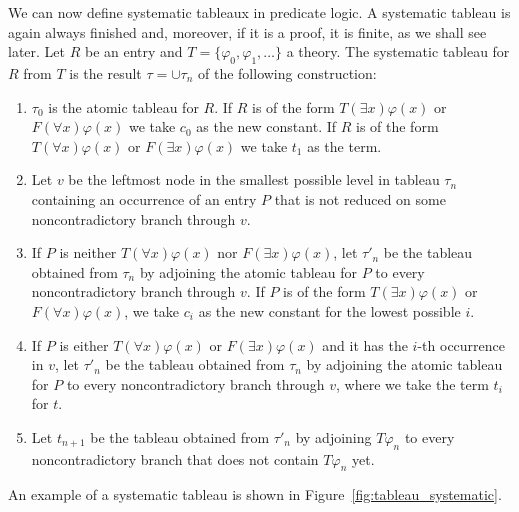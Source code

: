 We can now define systematic tableaux in predicate logic. A systematic tableau is again always finished and, moreover, if it is a proof, it is finite, as we shall see later. Let $R$ be an entry and $T=\{\varphi_0, \varphi_1, \dots\}$ a theory. The systematic tableau for $R$ from $T$ is the result $\tau = \cup \tau_n$ of the following construction:
\begin{enumerate}
  \item $\tau_0$ is the atomic tableau for $R$. If $R$ is of the form $T(\exists x)\varphi(x)$ or $F(\forall x) \varphi(x)$ we take $c_0$ as the new constant. If $R$ is of the form $T(\forall x) \varphi(x)$ or $F(\exists x) \varphi(x)$ we take $t_1$ as the term.
  \item Let $v$ be the leftmost node in the smallest possible level in tableau $\tau_n$ containing an occurrence of an entry $P$ that is not reduced on some noncontradictory branch through $v$.
  \item If $P$ is neither $T(\forall x)\varphi(x)$ nor $F(\exists x)\varphi(x)$, let $\tau'_n$ be the tableau obtained from $\tau_n$ by adjoining the atomic tableau for $P$ to every noncontradictory branch through $v$. If $P$ is of the form $T(\exists x)\varphi(x)$ or $F(\forall x) \varphi(x)$, we take $c_i$ as the new constant for the lowest possible $i$.
  \item If $P$ is either $T(\forall x)\varphi(x)$ or $F(\exists x)\varphi(x)$ and it has the $i$-th occurrence in $v$, let $\tau'_n$ be the tableau obtained from $\tau_n$ by adjoining the atomic tableau for $P$ to every noncontradictory branch through $v$, where we take the term $t_i$ for $t$.
  \item Let $t_{n+1}$ be the tableau obtained from $\tau'_n$ by adjoining $T \varphi_n$ to every noncontradictory branch that does not contain $T \varphi_n$ yet.
\end{enumerate}  

An example of a systematic tableau is shown in Figure~\ref{fig:tableau_systematic}.

